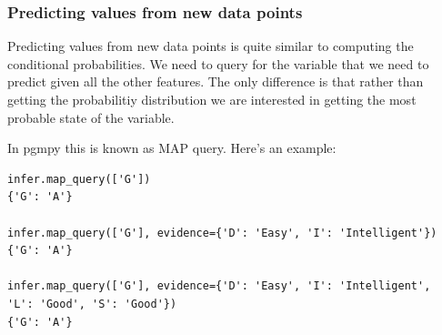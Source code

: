 \documentclass{article}
\begin{document}
\subsubsection{Predicting values from new data points}

Predicting values from new data points is quite similar to computing the conditional probabilities. We need to query for the variable that we need to predict given all the other features. The only difference is that rather than getting the probabilitiy distribution we are interested in getting the most probable state of the variable.

In pgmpy this is known as MAP query. Here's an example:

\begin{verbatim}
infer.map_query(['G'])
{'G': 'A'}

infer.map_query(['G'], evidence={'D': 'Easy', 'I': 'Intelligent'})
{'G': 'A'}

infer.map_query(['G'], evidence={'D': 'Easy', 'I': 'Intelligent',
'L': 'Good', 'S': 'Good'})
{'G': 'A'}
\end{verbatim}
\end{document}

